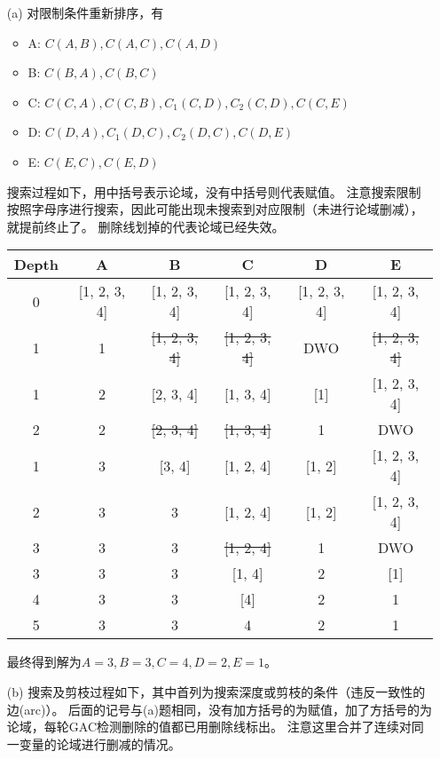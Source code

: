 \documentclass[a4paper, 11pt]{article}
\begin{document}
\begin{answer}
\begin{itemize}
\item [(a)] 对限制条件重新排序，有
\begin{itemize}
    \item A: $C(A,B),C(A,C),C(A,D)$
    \item B: $C(B,A),C(B,C)$
    \item C: $C(C,A),C(C,B),C_1(C,D),C_2(C,D),C(C,E)$
    \item D: $C(D,A),C_1(D,C),C_2(D,C),C(D,E)$
    \item E: $C(E,C),C(E,D)$
\end{itemize}
搜索过程如下，用中括号表示论域，没有中括号则代表赋值。
注意搜索限制按照字母序进行搜索，因此可能出现未搜索到对应限制（未进行论域删减），就提前终止了。
删除线划掉的代表论域已经失效。
\begin{center}
\begin{tabular}{|c|c|c|c|c|c|}\hline
    Depth & A & B & C & D & E \\\hline
    0 & [1, 2, 3, 4] & [1, 2, 3, 4] & [1, 2, 3, 4] & [1, 2, 3, 4] & [1, 2, 3, 4]\\\hline
    1 & 1 & \sout{[1, 2, 3, 4]} & \sout{[1, 2, 3, 4]} & DWO & \sout{[1, 2, 3, 4]}\\ \hline
    1 & 2 & [2, 3, 4] & [1, 3, 4] & [1] & [1, 2, 3, 4]\\ \hline
    2 & 2 & \sout{[2, 3, 4]} & \sout{[1, 3, 4]} & 1 & DWO\\ \hline
    1 & 3 & [3, 4] & [1, 2, 4] & [1, 2] & [1, 2, 3, 4]\\ \hline
    2 & 3 & 3 & [1, 2, 4] & [1, 2] & [1, 2, 3, 4]\\ \hline
    3 & 3 & 3 & \sout{[1, 2, 4]} & 1 & DWO\\ \hline
    3 & 3 & 3 & [1, 4] & 2 & [1]\\ \hline
    4 & 3 & 3 & [4] & 2 & 1\\ \hline
    5 & 3 & 3 & 4 & 2 & 1\\ \hline
\end{tabular}
\end{center}
最终得到解为$A=3,B=3,C=4,D=2,E=1$。
\item [(b)]
搜索及剪枝过程如下，其中首列为搜索深度或剪枝的条件（违反一致性的边(arc)）。
后面的记号与(a)题相同，没有加方括号的为赋值，加了方括号的为论域，每轮GAC检测删除的值都已用删除线标出。
注意这里合并了连续对同一变量的论域进行删减的情况。
\begin{center}
\begin{longtable}{|c|c|c|c|c|c|}\hline

\end{longtable}
\end{center}
\end{itemize}
\end{answer}
\end{document}
